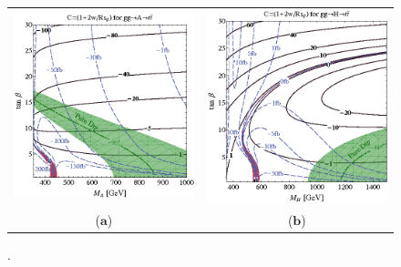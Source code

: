 \begin{figure}[htp]
\centering
\begin{tabular}{cc}
\hspace{-0.3cm}
\includegraphics[scale=0.42]{fig/chapt2/nwafix-ttbar-A.png}
& \hspace{-0.4cm} \includegraphics[scale=0.4]{fig/chapt2/nwafix-ttbar-H.png}\\
  \qquad ($\mathbf{a}$)\qquad\qquad&($\mathbf{b}$) \\
\end{tabular}
\caption{ \cite{}. }\label{fig:NWA_H_A}
\end{figure}


